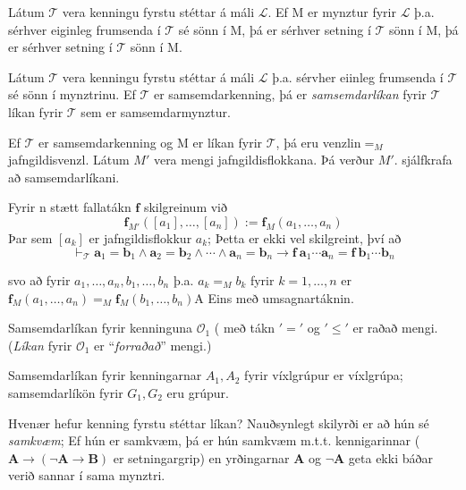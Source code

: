 \documentclass[12pt]{book}
\begin{document}
\begin{setn}[Fylgisetning]
 Látum $\mathcal{T}$ vera kenningu fyrstu stéttar á máli $\mathcal{L}$. Ef M er
 mynztur fyrir $\mathcal{L}$ þ.a. sérhver eiginleg frumsenda í $\mathcal{T}$ sé sönn
 í M, þá er sérhver setning í $\mathcal{T}$ sönn í M, þá er sérhver setning í 
 $ \mathcal{T} $ sönn í M.
\end{setn}

\begin{skgr} Látum $\mathcal{T}$ vera kenningu fyrstu stéttar á máli $\mathcal{L}$ þ.a. 
  sérvher eiinleg frumsenda í $\mathcal{T}$ sé sönn í mynztrinu. Ef $\mathcal{T}$ er samsemdarkenning,
  þá er \emph{samsemdarlíkan} fyrir $\mathcal{T}$ líkan fyrir $\mathcal{T}$ sem er 
  samsemdarmynztur.
\end{skgr}

\begin{ath}
  Ef $\mathcal{T}$ er samsemdarkenning og M er líkan fyrir $\mathcal{T}$, þá eru
  venzlin$=_{M}$ jafngildisvenzl. Látum $M'$ vera mengi jafngildisflokkana. Þá verður $M'$.
  sjálfkrafa að samsemdarlíkani.
\end{ath}

Fyrir n stætt fallatákn $\mathbf{f}$ skilgreinum við
\[\mathbf{f}_{M'}([a_1], \dotsc, [a_n]) := \mathbf{f}_{M} (a_1, \dotsc, a_n) \]
Þar sem $[a_k]$ er jafngildisflokkur $a_k$;
Þetta er ekki vel skilgreint, því að
 \[\vdash_{\mathcal{T}} \mathbf{a}_1 = \mathbf{b}_1 \wedge \mathbf{a}_2 = \mathbf{b}_2
 \wedge \dotsb \wedge \mathbf{a}_n 
= \mathbf{b}_n \rightarrow \mathbf{f}\: \mathbf{a}_1 \dotsb \mathbf{a}_n = \mathbf{f}\: \mathbf{b}_1 \dotsb \mathbf{b}_n \]

svo að fyrir $a_1, \dotsc, a_n, b_1, \dotsc, b_n$ þ.a. 
$a_k =_{M} b_k$ fyrir $k = 1, \dotsc, n$ er $\mathbf{f}_{M} (a_1, \dotsc, a_n) =_{M} \mathbf{f}_{M} (b_1, \dotsc, b_n)$A
Eins með umsagnartáknin.


\begin{daemi}
  Samsemdarlíkan fyrir kenninguna $\mathcal{O}_1$ ( með tákn $'='$ og $'\leq'$
  er raðað mengi. (\emph{Líkan} fyrir $\mathcal{O}_1$ er ``\emph{forraðað}'' mengi.)

  Samsemdarlíkan fyrir kenningarnar $A_1, A_2$
  fyrir víxlgrúpur er víxlgrúpa; samsemdarlíkön fyrir $G_1, G_2$ eru 
  grúpur.

  Hvenær hefur kenning fyrstu stéttar líkan?
  Nauðsynlegt skilyrði er að hún sé \emph{samkvæm}; Ef hún er samkvæm, þá er 
  hún samkvæm m.t.t. kennigarinnar ($\mathbf{A} \rightarrow (\lnot \mathbf{A} \rightarrow \mathbf{B})$ er setningargrip)
  en yrðingarnar $\mathbf{A}$ og $\lnot \mathbf{A}$ geta ekki báðar verið sannar í sama mynztri.
\end{daemi}
\end{document}
